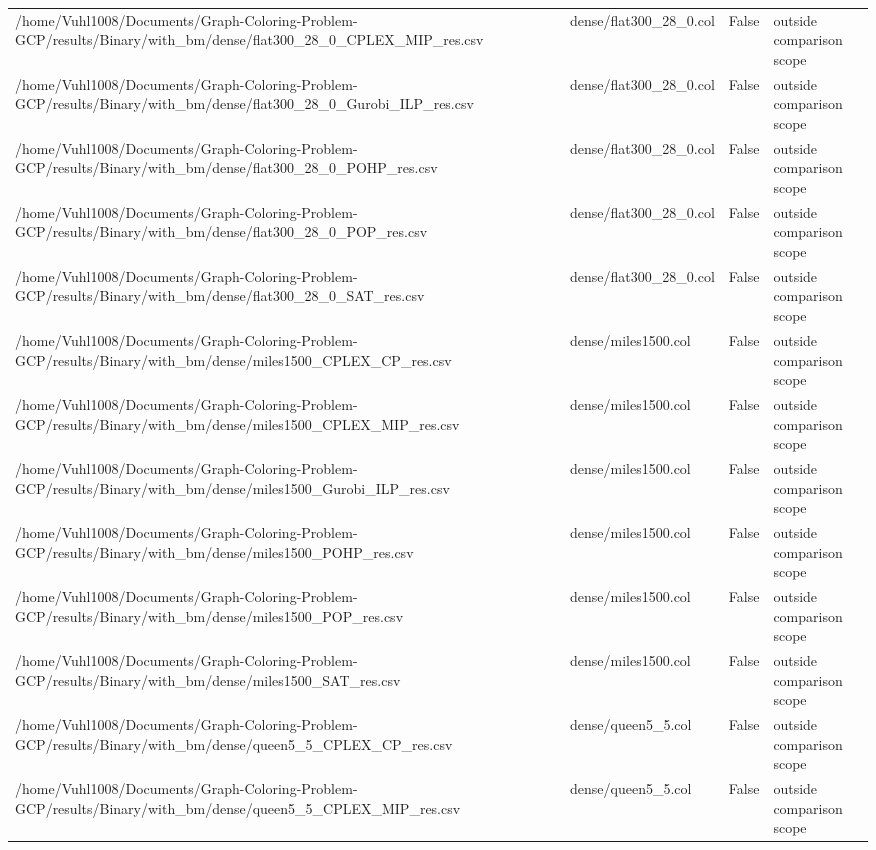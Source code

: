 \begin{table}[htbp]
\begin{tabular}{llll}
/home/Vuhl1008/Documents/Graph-Coloring-Problem-GCP/results/Binary/with\_bm/dense/flat300\_28\_0\_CPLEX\_MIP\_res.csv & dense/flat300\_28\_0.col & False & outside comparison scope \\
/home/Vuhl1008/Documents/Graph-Coloring-Problem-GCP/results/Binary/with\_bm/dense/flat300\_28\_0\_Gurobi\_ILP\_res.csv & dense/flat300\_28\_0.col & False & outside comparison scope \\
/home/Vuhl1008/Documents/Graph-Coloring-Problem-GCP/results/Binary/with\_bm/dense/flat300\_28\_0\_POHP\_res.csv & dense/flat300\_28\_0.col & False & outside comparison scope \\
/home/Vuhl1008/Documents/Graph-Coloring-Problem-GCP/results/Binary/with\_bm/dense/flat300\_28\_0\_POP\_res.csv & dense/flat300\_28\_0.col & False & outside comparison scope \\
/home/Vuhl1008/Documents/Graph-Coloring-Problem-GCP/results/Binary/with\_bm/dense/flat300\_28\_0\_SAT\_res.csv & dense/flat300\_28\_0.col & False & outside comparison scope \\
/home/Vuhl1008/Documents/Graph-Coloring-Problem-GCP/results/Binary/with\_bm/dense/miles1500\_CPLEX\_CP\_res.csv & dense/miles1500.col & False & outside comparison scope \\
/home/Vuhl1008/Documents/Graph-Coloring-Problem-GCP/results/Binary/with\_bm/dense/miles1500\_CPLEX\_MIP\_res.csv & dense/miles1500.col & False & outside comparison scope \\
/home/Vuhl1008/Documents/Graph-Coloring-Problem-GCP/results/Binary/with\_bm/dense/miles1500\_Gurobi\_ILP\_res.csv & dense/miles1500.col & False & outside comparison scope \\
/home/Vuhl1008/Documents/Graph-Coloring-Problem-GCP/results/Binary/with\_bm/dense/miles1500\_POHP\_res.csv & dense/miles1500.col & False & outside comparison scope \\
/home/Vuhl1008/Documents/Graph-Coloring-Problem-GCP/results/Binary/with\_bm/dense/miles1500\_POP\_res.csv & dense/miles1500.col & False & outside comparison scope \\
/home/Vuhl1008/Documents/Graph-Coloring-Problem-GCP/results/Binary/with\_bm/dense/miles1500\_SAT\_res.csv & dense/miles1500.col & False & outside comparison scope \\
/home/Vuhl1008/Documents/Graph-Coloring-Problem-GCP/results/Binary/with\_bm/dense/queen5\_5\_CPLEX\_CP\_res.csv & dense/queen5\_5.col & False & outside comparison scope \\
/home/Vuhl1008/Documents/Graph-Coloring-Problem-GCP/results/Binary/with\_bm/dense/queen5\_5\_CPLEX\_MIP\_res.csv & dense/queen5\_5.col & False & outside comparison scope \\

\end{tabular}
\end{table}
